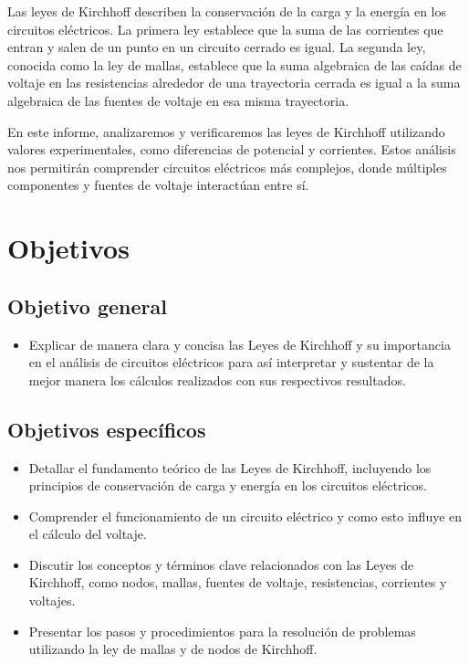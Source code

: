 \documentclass[twocolumn, 12pt]{article}
\begin{document}
Las leyes de Kirchhoff describen la conservación de la
carga y la energía en los circuitos eléctricos. La primera
ley establece que la suma de las corrientes que entran y
salen de un punto en un circuito cerrado es igual. La
segunda ley, conocida como la ley de mallas, establece que
la suma algebraica de las caídas de voltaje en las
resistencias alrededor de una trayectoria cerrada es igual
a la suma algebraica de las fuentes de voltaje en esa misma
trayectoria.

En este informe, analizaremos y verificaremos las leyes de
Kirchhoff utilizando valores experimentales, como
diferencias de potencial y corrientes. Estos análisis nos
permitirán comprender circuitos eléctricos más complejos,
donde múltiples componentes y fuentes de voltaje
interactúan entre sí.

\section{Objetivos}

\subsection{Objetivo general}

\begin{itemize}[label=$\triangleright$]
    \item Explicar de manera clara y concisa las Leyes de Kirchhoff y
          su importancia en el análisis de circuitos eléctricos para
          así interpretar y sustentar de la mejor manera los cálculos
          realizados con sus respectivos resultados.
\end{itemize}

\subsection{Objetivos específicos}

\begin{itemize}[label=$\triangleright$]
    \item Detallar el fundamento teórico de las Leyes de Kirchhoff,
          incluyendo los principios de conservación de carga y
          energía en los circuitos eléctricos.
    \item Comprender el funcionamiento de un circuito eléctrico y
          como esto influye en el cálculo del voltaje.
    \item Discutir los conceptos y términos clave relacionados con
          las Leyes de Kirchhoff, como nodos, mallas, fuentes de
          voltaje, resistencias, corrientes y voltajes.
    \item Presentar los pasos y procedimientos para la resolución de
          problemas utilizando la ley de mallas y de nodos de
          Kirchhoff.
\end{itemize}
\end{document}
